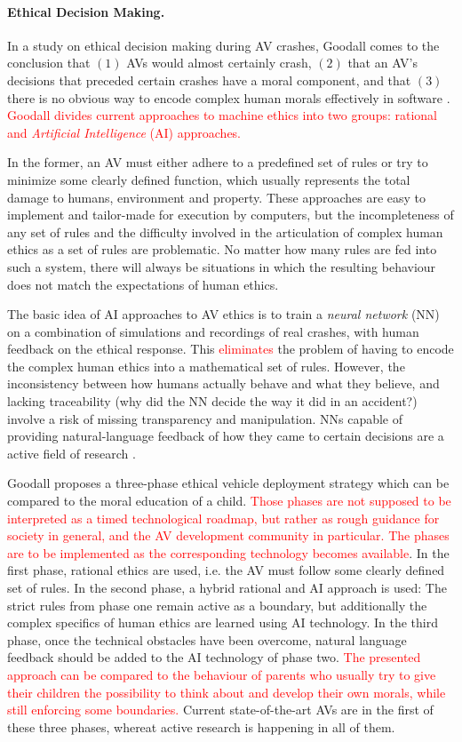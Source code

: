 \documentclass[11pt]{article}
\newcommand{\changed}[1]{\textcolor{red}{#1}}
\begin{document}
\paragraph{Ethical Decision Making.}
\label{sec:ethics}
In a study on ethical decision making during AV crashes, Goodall comes to the conclusion that $(1)$ AVs would almost certainly crash, $(2)$ that an AV's decisions that preceded certain crashes have a moral component, and that $(3)$ there is no obvious way to encode complex human morals effectively in software \cite{Goodall2014ethical}. \changed{Goodall divides current approaches to machine ethics into two groups: rational and \textit{Artificial Intelligence} (AI) approaches.}

In the former, an AV must either adhere to a predefined set of rules or try to minimize some clearly defined function, which usually represents the total damage to humans, environment and property. These approaches are easy to implement and tailor-made for execution by computers, but the incompleteness of any set of rules and the difficulty involved in the articulation of complex human ethics as a set of rules are problematic. No matter how many rules are fed into such a system, there will always be situations in which the resulting behaviour does not match the expectations of human ethics.

The basic idea of AI approaches to AV ethics is to train a \textit{neural network} (NN) on a combination of simulations and recordings of real crashes, with human feedback on the ethical response. This \changed{eliminates} the problem of having to encode the complex human ethics into a mathematical set of rules. However, the inconsistency between how humans actually behave and what they believe, and lacking traceability (why did the NN decide the way it did in an accident?) involve a risk of missing transparency and manipulation. NNs capable of providing natural-language feedback of how they came to certain decisions are a active field of research \cite[p. 63]{Goodall2014ethical}.

Goodall proposes a three-phase ethical vehicle deployment strategy \cite[p.63]{Goodall2014ethical} which can be compared to the moral education of a child. \changed{Those phases are not supposed to be interpreted as a timed technological roadmap, but rather as rough guidance for society in general, and the AV development community in particular. The phases are to be implemented as the corresponding technology becomes available}. In the first phase, rational ethics are used, i.e. the AV must follow some clearly defined set of rules. In the second phase, a hybrid rational and AI approach is used: The strict rules from phase one remain active as a boundary, but additionally the complex specifics of human ethics are learned using AI technology. In the third phase, once the technical obstacles have been overcome, natural language feedback should be added to the AI technology of phase two. \changed{The presented approach can be compared to the behaviour of parents who usually try to give their children the possibility to think about and develop their own morals, while still enforcing some boundaries.} Current state-of-the-art AVs are in the first of these three phases, whereat active research is happening in all of them.
\end{document}
